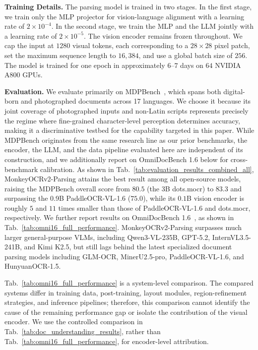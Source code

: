 \documentclass{article}
\begin{document}
\textbf{Training Details.} The parsing model is trained in two stages. In the first stage, we train only the MLP projector for vision-language alignment with a learning rate of $2 \times 10^{-4}$. In the second stage, we train the MLP and the LLM jointly with a learning rate of $2 \times 10^{-5}$. The vision encoder remains frozen throughout. We cap the input at $1280$ visual tokens, each corresponding to a $28 \times 28$ pixel patch, set the maximum sequence length to $16{,}384$, and use a global batch size of $256$. The model is trained for one epoch in approximately $6$--$7$ days on $64$ NVIDIA A800 GPUs.



\textbf{Evaluation.} We evaluate primarily on MDPBench~\cite{mdpbench}, which spans both digital-born and photographed documents across 17 languages. We choose it because its joint coverage of photographed inputs and non-Latin scripts represents precisely the regime where fine-grained character-level perception determines accuracy, making it a discriminative testbed for the capability targeted in this paper.
While MDPBench originates from the same research line as our prior benchmarks, the encoder, the LLM, and the data pipeline evaluated here are independent of its construction, and we additionally report on OmniDocBench 1.6 below for cross-benchmark calibration.
As shown in Tab.~\ref{tab:evaluation_results_combined_all}, MonkeyOCRv2-Parsing attains the best result among all open-source models, raising the MDPBench overall score from $80.5$ (the 3B dots.mocr) to $83.3$ and surpassing the 0.9B PaddleOCR-VL-1.6 ($75.0$), while its $0.1$B vision encoder is roughly $5$ and $11$ times smaller than those of PaddleOCR-VL-1.6 and dots.mocr, respectively.
We further report results on OmniDocBench 1.6~\cite{omnidocbench}, as shown in Tab.~\ref{tab:omni16_full_performance}. MonkeyOCRv2-Parsing surpasses much larger general-purpose VLMs, including Qwen3-VL-235B, GPT-5.2, InternVL3.5-241B, and Kimi K2.5, but still lags behind
the
latest specialized document parsing models including GLM-OCR, 
MinerU2.5-pro, PaddleOCR-VL-1.6, and HunyuanOCR-1.5.

Tab.~\ref{tab:omni16_full_performance} is a system-level comparison. The compared systems differ in training data, post-training, layout modules, region-refinement strategies, and inference pipelines; therefore, this comparison cannot identify the cause of the remaining performance gap or isolate the contribution of the visual encoder. We use the controlled comparison in Tab.~\ref{tab:doc_understanding_results}, rather than Tab.~\ref{tab:omni16_full_performance}, for encoder-level attribution.
\end{document}
